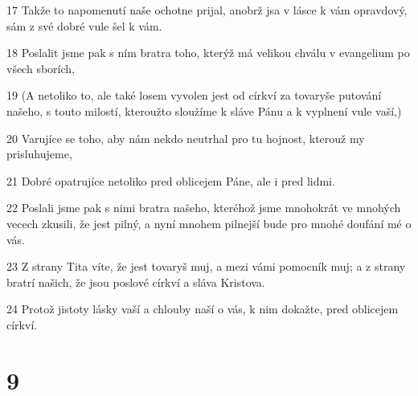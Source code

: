 \par 17 Takže to napomenutí naše ochotne prijal, anobrž jsa v lásce k vám opravdový, sám z své dobré vule šel k vám.
\par 18 Poslalit jsme pak s ním bratra toho, kterýž má velikou chválu v evangelium po všech sborích,
\par 19 (A netoliko to, ale také losem vyvolen jest od církví za tovaryše putování našeho, s touto milostí, kteroužto sloužíme k sláve Pánu a k vyplnení vule vaší,)
\par 20 Varujíce se toho, aby nám nekdo neutrhal pro tu hojnost, kterouž my prisluhujeme,
\par 21 Dobré opatrujíce netoliko pred oblicejem Páne, ale i pred lidmi.
\par 22 Poslali jsme pak s nimi bratra našeho, kteréhož jsme mnohokrát ve mnohých vecech zkusili, že jest pilný, a nyní mnohem pilnejší bude pro mnohé doufání mé o vás.
\par 23 Z strany Tita víte, že jest tovaryš muj, a mezi vámi pomocník muj; a z strany bratrí našich, že jsou poslové církví a sláva Kristova.
\par 24 Protož jistoty lásky vaší a chlouby naší o vás, k nim dokažte, pred oblicejem církví.

\chapter{9}

